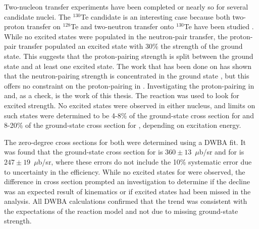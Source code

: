 Two-nucleon transfer experiments have been completed or nearly so for several candidate nuclei.  The $^{130}$Te candidate is an interesting case because both two-proton transfer on $^{128}$Te and two-neutron transfer onto $^{130}$Te have been studied \cite{protonPairsTellurium,neutronPairsTellurium}.  While no excited \zp states were populated in the neutron-pair transfer, the proton-pair transfer populated an excited \zp state with 30\% the strength of the ground state.  This suggests that the proton-pairing strength is split between the ground state and at least one excited \zp state.   The work that has been done on  has shown that the neutron-pairing strength is concentrated in the ground state \cite{neutronPairsGermanium}, but this offers no constraint on the proton-pairing in .  Investigating the proton-pairing in  and, as a check,  is the work of this thesis.  The reaction \reaction was used to look for excited \zp strength.  No excited \zp states were observed in either nucleus, and limits on such states were determined to be 4-8\% of the ground-state cross section for  and 8-20\% of the ground-state cross section for , depending on excitation energy.  

The zero-degree cross sections for both \GeTargets were determined using a DWBA fit.  It was found that the ground-state cross section for  is $360\pm13$~$\mu$b/sr and for  is $247\pm19$~$\mu$b/sr, where these errors do not include the 10\% systematic error due to uncertainty in the efficiency.  While no excited states for  were observed, the difference in cross section prompted an investigation to determine if the decline was an expected result of kinematics or if excited \zp states had been missed in the analysis.  All DWBA calculations confirmed that the trend was consistent with the expectations of the reaction model and not due to missing ground-state \zp strength. 


